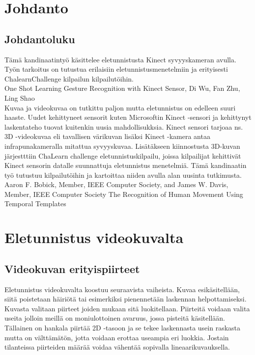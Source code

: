 
\section{Johdanto}



\subsection{Johdantoluku}

Tämä kandinaatintyö käsittelee eletunnistusta Kinect syvyyskameran avulla. 
Työn tarkoitus on tutustua erilaisiin eletunnistusmenetelmiin ja erityisesti ChalearnChallenge kilpailun kilpailutöihin. 
\\
One Shot Learning Gesture Recognition with Kinect Sensor, Di Wu, Fan Zhu, Ling Shao\\
Kuvaa ja videokuvaa on tutkittu paljon mutta eletunnistus on edelleen suuri haaste. Uudet kehittyneet
sensorit kuten Microsoftin Kinect -sensori ja kehittynyt laskentateho tuovat kuitenkin uusia mahdollisukksia. 
Kinect sensori tarjoaa ns. 3D -videokuvaa eli tavallisen värikuvan lisäksi Kinect -kamera antaa infrapunakameralla mitattua syvyyskuvaa.
Lisätäkseen kiinnostusta 3D-kuvan järjestttiin ChaLearn challenge eletunnistuskilpailu, joissa kilpailijat kehittivät Kinect sensorin datalle suunnattuja 
eletunnistus menetelmiä. Tämä kandinaatin työ tutustuu kilpailutöihin ja kartoittaa niiden avulla alan uusinta tutkimusta.\\
Aaron F. Bobick, Member, IEEE Computer Society, and
James W. Davis, Member, IEEE Computer Society
The Recognition of Human Movement Using Temporal Templates\\



\section{Eletunnistus videokuvalta}
\label{Eletunnistus videokuvalta}


\subsection{Videokuvan erityispiirteet}
Eletunnistus videokuvalta koostuu seuraavista vaiheista. Kuvaa esikäsitellään, siitä poistetaan häiriötä tai esimerkiksi pienennetään laskennan helpottamiseksi.
Kuvasta valitaan piirteet joiden mukaan sitä luokitellaan. Piirteitä voidaan valita useita jolloin meillä on moniulottoinen avaruus, jossa pisteitä käsitellään. Tällainen on hankala piirtää 2D -tasoon ja se tekee laskennasta usein raskasta
mutta on välttämätön, jotta voidaan erottaa useampia eri luokkia. Jostain tilanteissa piirteiden määrää voidaa vähentää sopivalla lineaarikuvauksella.\\


